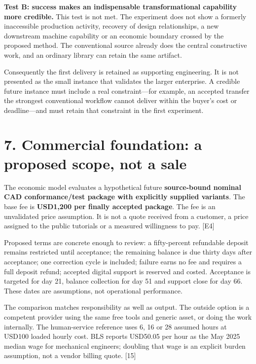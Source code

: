 \documentclass[11pt,letterpaper]{article}
\begin{document}
\textbf{Test B: success makes an indispensable transformational capability more credible.} This test is not met. The experiment does not show a formerly inaccessible production activity, recovery of design relationships, a new downstream machine capability or an economic boundary crossed by the proposed method. The conventional source already does the central constructive work, and an ordinary library can retain the same artifact.

Consequently the first delivery is retained as supporting engineering. It is not presented as the small instance that validates the larger enterprise. A credible future instance must include a real constraint---for example, an accepted transfer the strongest conventional workflow cannot deliver within the buyer's cost or deadline---and must retain that constraint in the first experiment.

\hypertarget{commercial-foundation-a-proposed-scope-not-a-sale}{%
\section{7. Commercial foundation: a proposed scope, not a sale}\label{commercial-foundation-a-proposed-scope-not-a-sale}}

The economic model evaluates a hypothetical future \textbf{source-bound nominal CAD conformance/test package with explicitly supplied variants}. The base fee is \textbf{USD1,200 per finally accepted package}. The fee is an unvalidated price assumption. It is not a quote received from a customer, a price assigned to the public tutorials or a measured willingness to pay. {[}E4{]}

Proposed terms are concrete enough to review: a fifty-percent refundable deposit remains restricted until acceptance; the remaining balance is due thirty days after acceptance; one correction cycle is included; failure earns no fee and requires a full deposit refund; accepted digital support is reserved and costed. Acceptance is targeted for day 21, balance collection for day 51 and support close for day 66. These dates are assumptions, not operational performance.

The comparison matches responsibility as well as output. The outside option is a competent provider using the same free tools and generic asset, or doing the work internally. The human-service reference uses 6, 16 or 28 assumed hours at USD100 loaded hourly cost. BLS reports USD50.05 per hour as the May 2025 median wage for mechanical engineers; doubling that wage is an explicit burden assumption, not a vendor billing quote. {[}15{]}
\end{document}
